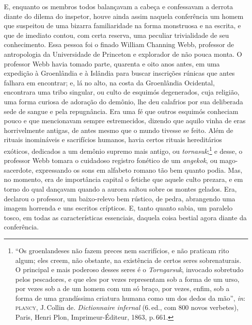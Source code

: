 E, enquanto os membros todos balançavam a cabeça e confessavam a
derrota diante do dilema do inspetor, houve ainda assim naquela
conferência um homem que suspeitou de uma bizarra familiaridade na forma
monstruosa e na escrita, e que de imediato contou, com certa reserva,
uma peculiar trivialidade de seu conhecimento. Essa pessoa foi o finado
William Channing Webb, professor de antropologia da Universidade de
Princeton e explorador de não pouca monta. O professor Webb havia
tomado parte, quarenta e oito anos antes, em uma expedição à Groenlândia
e à Islândia para buscar inscrições rúnicas que antes falhara em
encontrar; e, lá no alto, na costa da Groenlândia Ocidental, encontrara
uma tribo singular, ou culto de esquimós degenerados, cuja religião, uma
forma curiosa de adoração do demônio, lhe deu calafrios por sua
deliberada sede de sangue e pela repugnância. Era uma fé que outros esquimós
conheciam pouco e que mencionavam sempre estremecidos, dizendo que
aquilo vinha de eras horrivelmente antigas, de antes mesmo que o mundo
tivesse se feito. Além de rituais inomináveis e sacrifícios humanos, havia
certos rituais hereditários exóticos, dedicados a um demônio supremo
mais antigo, ou \emph{tornasuk};\footnote{``Os groenlandeses não fazem
  preces nem sacrifícios, e não praticam rito algum; eles creem, não
  obstante, na existência de certos seres sobrenaturais. O principal e
  mais poderoso desses seres é o \emph{Torngarsuk}, invocado sobretudo
  pelos pescadores, e que eles por vezes representam sob a forma de um
  urso, por vezes sob a de um homem com um só braço, por vezes, enfim,
  sob a forma de uma grandíssima criatura humana como um dos dedos da
  mão'', \emph{in}: \textsc{plancy}, J.\,Collin de. \emph{Dictionnaire infernal}
  (6.\,ed., com 800 novos verbetes), Paris, Henri
  Plon, Imprimeur-Éditeur, 1863, p.\,661.} e desse, o professor Webb
tomara o cuidadoso registro fonético de um \emph{angekok}, ou
mago-sacerdote, expressando os sons em alfabeto romano tão bem quanto
podia. Mas, no momento, era de importância capital o fetiche que
aquele culto prezara, e em torno do qual dançavam quando a aurora saltou
sobre os montes gelados. Era, declarou o professor, um baixo-relevo bem
rústico, de pedra, abrangendo uma imagem horrenda e uns escritos
crípticos. E, tanto quanto sabia, um paralelo tosco, em todas as
características essenciais, daquela coisa bestial agora diante da
conferência.


